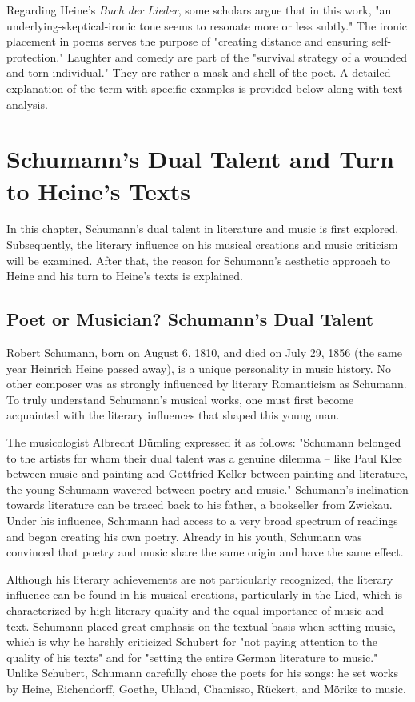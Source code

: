 \documentclass[10pt,a4paper,twocolumn]{rho}
\begin{document}
Regarding Heine's \textit{Buch der Lieder}, some scholars argue that in this work, "an underlying-skeptical-ironic tone seems to resonate more or less subtly." The ironic placement in poems serves the purpose of "creating distance and ensuring self-protection." Laughter and comedy are part of the "survival strategy of a wounded and torn individual." They are rather a mask and shell of the poet. A detailed explanation of the term with specific examples is provided below along with text analysis.

\section{Schumann's Dual Talent and Turn to Heine's Texts}

In this chapter, Schumann's dual talent in literature and music is first explored. Subsequently, the literary influence on his musical creations and music criticism will be examined. After that, the reason for Schumann's aesthetic approach to Heine and his turn to Heine's texts is explained.

\subsection{Poet or Musician? Schumann's Dual Talent}
Robert Schumann, born on August 6, 1810, and died on July 29, 1856 (the same year Heinrich Heine passed away), is a unique personality in music history. No other composer was as strongly influenced by literary Romanticism as Schumann. To truly understand Schumann's musical works, one must first become acquainted with the literary influences that shaped this young man.

The musicologist Albrecht Dümling expressed it as follows: "Schumann belonged to the artists for whom their dual talent was a genuine dilemma – like Paul Klee between music and painting and Gottfried Keller between painting and literature, the young Schumann wavered between poetry and music." Schumann's inclination towards literature can be traced back to his father, a bookseller from Zwickau. Under his influence, Schumann had access to a very broad spectrum of readings and began creating his own poetry. Already in his youth, Schumann was convinced that poetry and music share the same origin and have the same effect.

Although his literary achievements are not particularly recognized, the literary influence can be found in his musical creations, particularly in the Lied, which is characterized by high literary quality and the equal importance of music and text. Schumann placed great emphasis on the textual basis when setting music, which is why he harshly criticized Schubert for "not paying attention to the quality of his texts" and for "setting the entire German literature to music." Unlike Schubert, Schumann carefully chose the poets for his songs: he set works by Heine, Eichendorff, Goethe, Uhland, Chamisso, Rückert, and Mörike to music.
\end{document}

